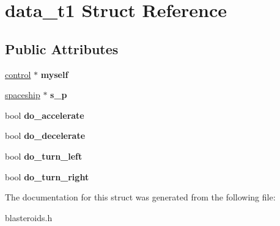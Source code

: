 \hypertarget{structdata__t1}{}\section{data\+\_\+t1 Struct Reference}
\label{structdata__t1}
\subsection*{Public Attributes}
\begin{DoxyCompactItemize}
\item 
\hypertarget{structdata__t1_ae4bae673b1a22aa56ec0eb6e44286391}{}\hyperlink{structcontrol}{control} $\ast$ {\bfseries myself}\label{structdata__t1_ae4bae673b1a22aa56ec0eb6e44286391}

\item 
\hypertarget{structdata__t1_ad5d361ed663e4291b942b686c3a44e14}{}\hyperlink{structspaceship}{spaceship} $\ast$ {\bfseries s\+\_\+p}\label{structdata__t1_ad5d361ed663e4291b942b686c3a44e14}

\item 
\hypertarget{structdata__t1_af76cdb19a5201e38b4932c65fc833a46}{}bool {\bfseries do\+\_\+accelerate}\label{structdata__t1_af76cdb19a5201e38b4932c65fc833a46}

\item 
\hypertarget{structdata__t1_a61c0f3ea181eba69a351ce6b20317952}{}bool {\bfseries do\+\_\+decelerate}\label{structdata__t1_a61c0f3ea181eba69a351ce6b20317952}

\item 
\hypertarget{structdata__t1_af287ed124b49f2892f83dd4c0c4d6f7c}{}bool {\bfseries do\+\_\+turn\+\_\+left}\label{structdata__t1_af287ed124b49f2892f83dd4c0c4d6f7c}

\item 
\hypertarget{structdata__t1_a6a875c324f924d177c489db790da2062}{}bool {\bfseries do\+\_\+turn\+\_\+right}\label{structdata__t1_a6a875c324f924d177c489db790da2062}

\end{DoxyCompactItemize}


The documentation for this struct was generated from the following file\+:\begin{DoxyCompactItemize}
\item 
blasteroids.\+h\end{DoxyCompactItemize}
